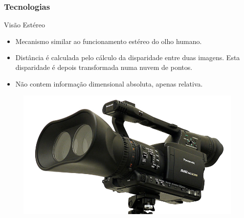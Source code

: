\subsubsection{Tecnologias}

\begin{frame}{Visão Estéreo}
				
	\begin{minipage}{0.5\textwidth}
		\begin{itemize}
			\item Mecanismo similar ao funcionamento estéreo do olho humano.
			\item Distância é calculada pelo cálculo da disparidade entre duas imagens. Esta disparidade é depois transformada numa nuvem de pontos.
			\item Não contem informação dimensional absoluta, apenas relativa.
		\end{itemize}
	\end{minipage}%
	\begin{minipage}{0.5\textwidth}
		\begin{figure}
			\includegraphics[width=1\textwidth]{img/3d-camera.jpg}
		\end{figure}
	\end{minipage}
						
\end{frame}

